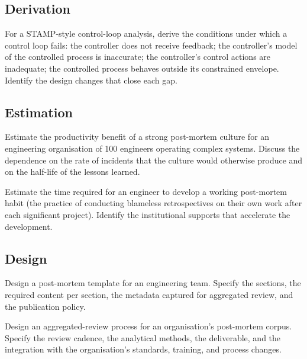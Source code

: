 \subsection*{Derivation}

\begin{exercise}
For a STAMP-style control-loop analysis, derive the conditions under which a control loop fails: the controller does not receive feedback; the controller's model of the controlled process is inaccurate; the controller's control actions are inadequate; the controlled process behaves outside its constrained envelope. Identify the design changes that close each gap.
\end{exercise}

\subsection*{Estimation}

\begin{exercise}
Estimate the productivity benefit of a strong post-mortem culture for an engineering organisation of 100 engineers operating complex systems. Discuss the dependence on the rate of incidents that the culture would otherwise produce and on the half-life of the lessons learned.
\end{exercise}

\begin{exercise}
Estimate the time required for an engineer to develop a working post-mortem habit (the practice of conducting blameless retrospectives on their own work after each significant project). Identify the institutional supports that accelerate the development.
\end{exercise}

\subsection*{Design}

\begin{exercise}
Design a post-mortem template for an engineering team. Specify the sections, the required content per section, the metadata captured for aggregated review, and the publication policy.
\end{exercise}

\begin{exercise}
Design an aggregated-review process for an organisation's post-mortem corpus. Specify the review cadence, the analytical methods, the deliverable, and the integration with the organisation's standards, training, and process changes.
\end{exercise}

